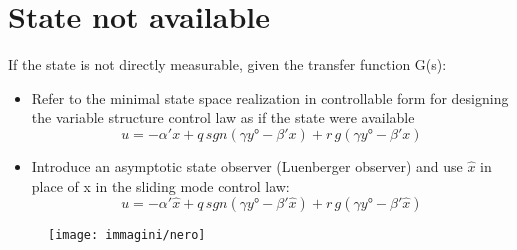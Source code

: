 \section{State not available}
If the state is not directly measurable, given the transfer function G(s):
\begin{itemize}
	\item Refer to the minimal state space realization in controllable form for designing the variable structure control law as if the state were available \[u=-\alpha'x+q\,sgn(\gamma y°-\beta'x)+r\,g(\gamma y°-\beta' x)\]
	\item Introduce an asymptotic state observer (Luenberger observer) and use $\hat{x}$ in place of x in the sliding mode control law: \[
	u=-\alpha'\hat{x}+q\,sgn(\gamma y°-\beta'\hat{x})+r\,g(\gamma y°-\beta' \hat{x})
	\]
\end{itemize}
\begin{figure}[H]
	\centering
	\texttt{[image: immagini/nero]}
	\label{fig:nero}
\end{figure}
